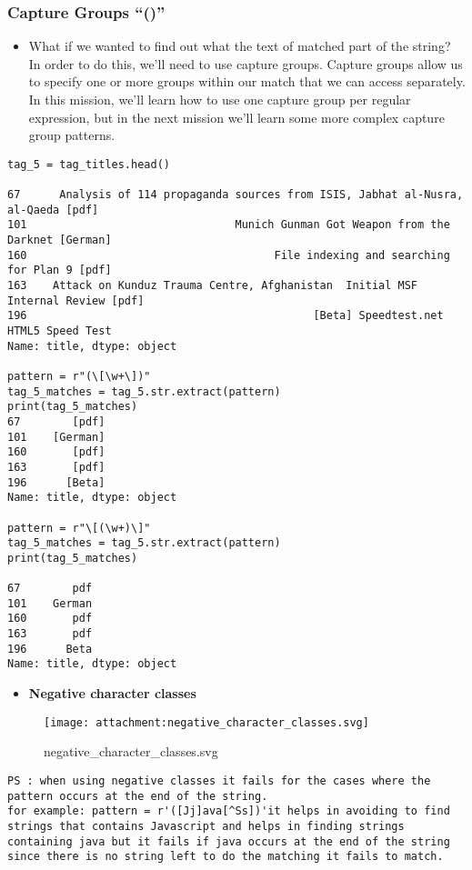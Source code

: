 \documentclass[11pt]{article}
\providecommand{\tightlist}{%
      \setlength{\itemsep}{0pt}\setlength{\parskip}{0pt}}
\begin{document}
\hypertarget{capture-groups}{%
\subsubsection{Capture Groups ``()''}\label{capture-groups}}

\begin{itemize}
\tightlist
\item
  What if we wanted to find out what the text of matched part of the
  string? In order to do this, we'll need to use capture groups. Capture
  groups allow us to specify one or more groups within our match that we
  can access separately. In this mission, we'll learn how to use one
  capture group per regular expression, but in the next mission we'll
  learn some more complex capture group patterns.
\end{itemize}

\begin{verbatim}
tag_5 = tag_titles.head()

67      Analysis of 114 propaganda sources from ISIS, Jabhat al-Nusra, al-Qaeda [pdf]
101                                Munich Gunman Got Weapon from the Darknet [German]
160                                      File indexing and searching for Plan 9 [pdf]
163    Attack on Kunduz Trauma Centre, Afghanistan  Initial MSF Internal Review [pdf]
196                                            [Beta] Speedtest.net  HTML5 Speed Test
Name: title, dtype: object

pattern = r"(\[\w+\])"
tag_5_matches = tag_5.str.extract(pattern)
print(tag_5_matches)
67        [pdf]
101    [German]
160       [pdf]
163       [pdf]
196      [Beta]
Name: title, dtype: object

pattern = r"\[(\w+)\]"
tag_5_matches = tag_5.str.extract(pattern)
print(tag_5_matches)

67        pdf
101    German
160       pdf
163       pdf
196      Beta
Name: title, dtype: object
\end{verbatim}

\begin{itemize}
\tightlist
\item
  \textbf{Negative character classes}
\end{itemize}

\begin{figure}
\centering
\texttt{[image: attachment:negative\_character\_classes.svg]}
\caption{negative\_character\_classes.svg}
\end{figure}

\begin{verbatim}
PS : when using negative classes it fails for the cases where the pattern occurs at the end of the string.
for example: pattern = r'([Jj]ava[^Ss])'it helps in avoiding to find strings that contains Javascript and helps in finding strings containing java but it fails if java occurs at the end of the string since there is no string left to do the matching it fails to match.
\end{verbatim}
\end{document}
